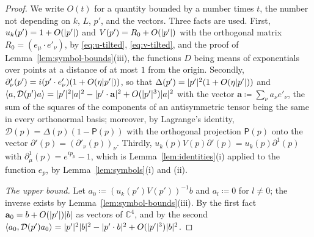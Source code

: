 \documentclass[11pt]{preprint}
\DeclarePairedDelimiter{\abs}{\lvert}{\rvert}
\numberwithin{equation}{section}
\theoremstyle{definition}
\theoremstyle{remark}
\theoremstyle{plain}
\begin{document}
\begin{proof}
We write $O(t)$ for a quantity bounded by a number times $t$, the number not depending on $k$, $L$, $p'$, and the vectors. Three facts are used. First, $u_k(p') = 1 + O(\abs{p'})$ and $V(p') = R_0 + O(\abs{p'})$ with the orthogonal matrix $R_0 = (e_\mu \cdot e'_\nu)$, by \eqref{eq:u-tilted}, \eqref{eq:v-tilted}, and the proof of Lemma~\ref{lem:symbol-bounds}(iii), the functions $D$ being means of exponentials over points at a distance of at most $1$ from the origin. Secondly, $\partial'_\nu(p') = i(p' \cdot e'_\nu)(1 + O(\eta\abs{p'}))$, so that $\Delta(p') = \abs{p'}^2(1 + O(\eta\abs{p'}))$ and $\langle a, \mathcal D(p')a\rangle = \abs{p'}^2\abs a^2 - \abs{p' \cdot \mathbf a}^2 + O(\abs{p'}^3)\abs a^2$ with the vector $\mathbf a \coloneqq \sum_\nu a_\nu e'_\nu$, the sum of the squares of the components of an antisymmetric tensor being the same in every orthonormal basis; moreover, by Lagrange's identity, $\mathcal D(p) = \Delta(p)(1 - \mathsf P(p))$ with the orthogonal projection $\mathsf P(p)$ onto the vector $\partial'(p) = (\partial'_\nu(p))_\nu$. Thirdly, $u_k(p)V(p)\partial'(p) = u_k(p)\partial^1(p)$ with $\partial^1_\mu(p) = e^{ip_\mu} - 1$, which is Lemma~\ref{lem:identities}(i) applied to the function $e_p$, by Lemma~\ref{lem:symbols}(i) and (ii).

\emph{The upper bound.} Let $a_0 \coloneqq (u_k(p')V(p'))^{-1}b$ and $a_l \coloneqq 0$ for $l \neq 0$; the inverse exists by Lemma~\ref{lem:symbol-bounds}(iii). By the first fact $\mathbf a_0 = b + O(\abs{p'})\abs b$ as vectors of $\mathbb C^4$, and by the second $\langle a_0, \mathcal D(p')a_0\rangle = \abs{p'}^2\abs b^2 - \abs{p' \cdot b}^2 + O(\abs{p'}^3)\abs b^2$.


\end{proof}
\end{document}
